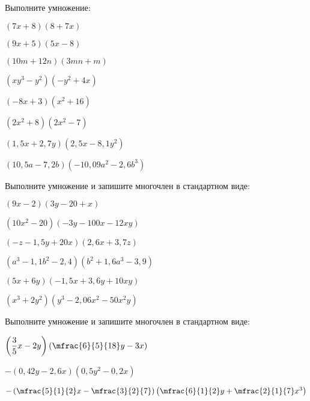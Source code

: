 %
%
%
%
\begin{class}[number=5]
	\begin{listofex}
		\item Выполните умножение:
		\begin{enumcols}[itemcolumns=2]
			\item \( (7x+8)(8+7x) \)
			\item \( (9x+5)(5x-8) \)
			\item \( (10m+12n)(3mn+m) \)
			\item \( (xy^3-y^2)(-y^2+4x) \)
			\item \( (-8x+3)(x^2+16) \)
			\item \( (2x^2+8)(2x^2-7) \)
			\item \( (1,5x+2,7y)(2,5x-8,1y^2) \)
			\item \( (10,5a-7,2b)(-10,09a^2-2,6b^3) \)
		\end{enumcols}
		\item Выполните умножение и запишите многочлен в стандартном виде:
		\begin{enumcols}[itemcolumns=2]
			\item \( (9x-2)(3y-20+x) \)
			\item \( (10x^2-20)(-3y-100x-12xy) \)
			\item \( (-z-1,5y+20x)(2,6x+3,7z) \)
			\item \( (a^3-1,1b^2-2,4)(b^2+1,6a^3-3,9) \)
			\item \( (5x+6y)(-1,5x+3,6y+10xy) \)
			\item \( (x^3+2y^2)(y^3-2,06x^2-50x^2y) \)
		\end{enumcols}
		\item Выполните умножение и запишите многочлен в стандартном виде:
		\begin{enumcols}[itemcolumns=2]
			\item \( \left( \dfrac{3}{5}x-2y \right)\left( \mfrac{6}{5}{18}y-3x \right) \)
			\item \( -(0,42y-2,6x)(0,5y^2-0,2x) \)
			\item \( -\left( \mfrac{5}{1}{2}x-\mfrac{3}{2}{7} \right)\left( \mfrac{6}{1}{2}y+\mfrac{2}{1}{7}x^3 \right) \)

\end{enumcols}
\end{listofex}
\end{class}
